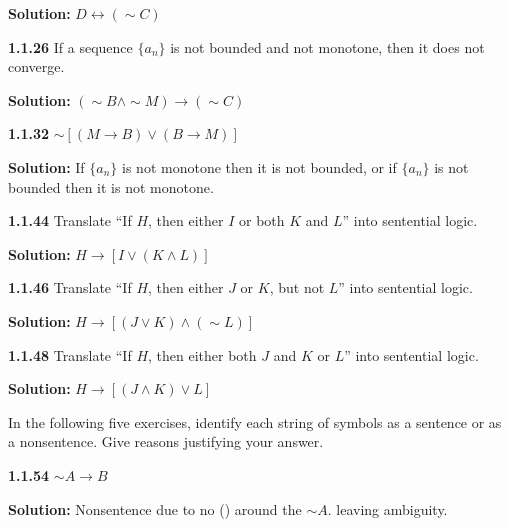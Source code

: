 \documentclass[12pt]{article}
\begin{document}
\doublespacing
\textbf{Solution:}  $D\leftrightarrow(\sim C)$

\singlespacing
\vspace{12pt}

\noindent\textbf{1.1.26} If a sequence $\{a_n\}$ is not bounded and not monotone, then it does not converge.

\doublespacing
\textbf{Solution:} $(\sim B \wedge \sim M)\rightarrow (\sim C)$

\singlespacing
\vspace{12pt}

\noindent\textbf{1.1.32} $\sim[(M\rightarrow B)\vee(B\rightarrow M)]$

\doublespacing
\textbf{Solution:} If $\{a_n\}$ is not monotone then it is not bounded, or if $\{a_n\}$ is not bounded then it is not monotone.

\singlespacing
\vspace{12pt}
\newpage

\noindent\textbf{1.1.44} Translate ``If $H$, then either $I$ or both $K$ and $L$'' into sentential logic.

\doublespacing
\textbf{Solution:} $H \rightarrow [I \vee (K \wedge L)]$

\singlespacing
\vspace{12pt}

\noindent\textbf{1.1.46} Translate ``If $H$, then either $J$ or $K$, but not $L$'' into sentential logic.

\doublespacing
\textbf{Solution:} $H \rightarrow [(J \vee K) \wedge (\sim L)]$

\singlespacing
\vspace{12pt}

\noindent\textbf{1.1.48} Translate ``If $H$, then either both $J$ and $K$ or $L$'' into sentential logic.

\doublespacing
\textbf{Solution:} $H \rightarrow [(J \wedge K) \vee L]$

\singlespacing
\vspace{12pt}


\vspace{12pt}

In the following five exercises, identify each string of symbols as a sentence or as a nonsentence.  Give reasons justifying your answer.

\vspace{12pt}

\noindent\textbf{1.1.54} $\sim A\rightarrow B$

\doublespacing
\textbf{Solution:} Nonsentence due to no () around the $\sim A$. leaving ambiguity.
\end{document}
